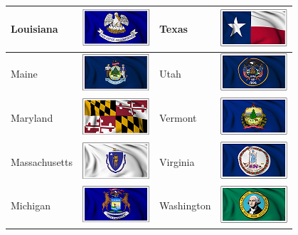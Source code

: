\documentclass{ximera}
\begin{document}
\begin{center}
\begin{tabular}{|l|l|l|l|}
Louisiana & \includegraphics{pics/StateFlags/Louisiana.png} & Texas & \includegraphics{pics/StateFlags/Texas.png} \\\hline 



Maine & \includegraphics{pics/StateFlags/Maine.png} & Utah & \includegraphics{pics/StateFlags/Utah.png} \\\hline 
Maryland & \includegraphics{pics/StateFlags/Maryland.png} & Vermont & \includegraphics{pics/StateFlags/Vermont.png} \\\hline 
Massachusetts & \includegraphics{pics/StateFlags/Massachusetts.png} & Virginia & \includegraphics{pics/StateFlags/Virginia.png} \\\hline 
Michigan & \includegraphics{pics/StateFlags/Michigan.png} & Washington & \includegraphics{pics/StateFlags/Washington.png} \\\hline 

\end{tabular}
\end{center}
\end{document}
